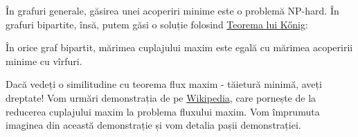 \documentclass[../main.tex]{subfiles}
\begin{document}
În grafuri generale, găsirea unei acoperiri minime este o problemă NP-hard. În grafuri bipartite, însă, putem găsi o soluție folosind \href{https://en.wikipedia.org/wiki/K\%C5\%91nig\%27s_theorem_(graph_theory)}{Teorema lui Kőnig}:

\begin{theorem}
  În orice graf bipartit, mărimea cuplajului maxim este egală cu mărimea acoperirii minime cu vîrfuri.
\end{theorem}

Dacă vedeți o similitudine cu teorema flux maxim - tăietură minimă, aveți dreptate! Vom urmări demonstrația de pe \href{https://en.wikipedia.org/wiki/K\%C5\%91nig\%27s_theorem_(graph_theory)#Constructive_proof}{Wikipedia}, care pornește de la reducerea cuplajului maxim la problema fluxului maxim. Vom împrumuta imaginea din această demonstrație și vom detalia pașii demonstrației.
\end{document}
